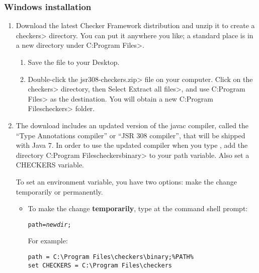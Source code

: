 \subsubsection{Windows installation\label{windows-installation}}

\begin{enumerate}

\item
  Download the latest Checker Framework distribution
  and unzip it to create a \<checkers> directory.  You can put it anywhere
  you like; a standard place is in a new directory under \<C:\ttbs{}Program
  Files>.

\begin{enumerate}
\item
  Save the file
  to your Desktop.
\item
  Double-click the \<jsr308-checkers.zip> file on your computer.  Click on
  the \<checkers> directory, then Select \<Extract all files>, and use
  \<C:\ttbs{}Program Files> as the destination.  You will obtain a new
  \<C:\ttbs{}Program Files\ttbs{}checkers> folder.
\end{enumerate}

\item
  The download includes an updated version of the javac compiler, called
  the ``Type Annotations compiler'' or ``JSR 308 compiler'', that will be
  shipped with Java 7.  In order to use the updated compiler when you type
  , add the directory \<C:\ttbs{}Program
  Files\ttbs{}checkers\ttbs{}binary> to your path variable.  Also set a
  CHECKERS variable.


To set an environment variable, you have two options:  make the change
temporarily or permanently.
\begin{itemize}
\item
To make the change \textbf{temporarily}, type at the command shell prompt:

\begin{alltt}
path = \emph{newdir};%PATH%
\end{alltt}

For example:

\begin{Verbatim}
path = C:\Program Files\checkers\binary;%PATH%
set CHECKERS = C:\Program Files\checkers
\end{Verbatim}


\end{itemize}
\end{enumerate}
